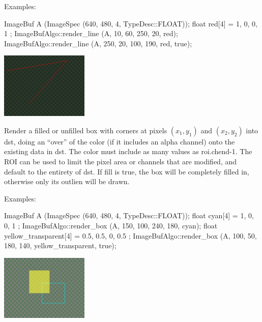 \smallskip
\noindent Examples:
\begin{code}
    ImageBuf A (ImageSpec (640, 480, 4, TypeDesc::FLOAT));
    float red[4] = { 1, 0, 0, 1 };
    ImageBufAlgo::render_line (A, 10, 60, 250, 20, red);
    ImageBufAlgo::render_line (A, 250, 20, 100, 190, red, true);
\end{code}

\spc \includegraphics[width=1.65in]{figures/lines.png}  \\
\apiend


 

Render a filled or unfilled box with corners at pixels $(x_1,y_1)$ and
$(x_2,y_2)$ into {\cf dst}, doing an ``over'' of the color (if it includes
an alpha channel) onto the existing data in {\cf dst}. The {\cf color} must
include as many values as {\cf roi.chend-1}. The ROI can be used to limit
the pixel area or channels that are modified, and default to the entirety of
{\cf dst}. If {\cf fill} is {\cf true}, the box will be completely filled in,
otherwise only its outlien will be drawn.

\smallskip
\noindent Examples:
\begin{code}
    ImageBuf A (ImageSpec (640, 480, 4, TypeDesc::FLOAT));
    float cyan[4] = { 1, 0, 0, 1 };
    ImageBufAlgo::render_box (A, 150, 100, 240, 180, cyan);
    float yellow_transparent[4] = { 0.5, 0.5, 0, 0.5 };
    ImageBufAlgo::render_box (A, 100, 50, 180, 140, yellow_transparent, true);
\end{code}

\spc \includegraphics[width=1.65in]{figures/box.png}  \\
\apiend



